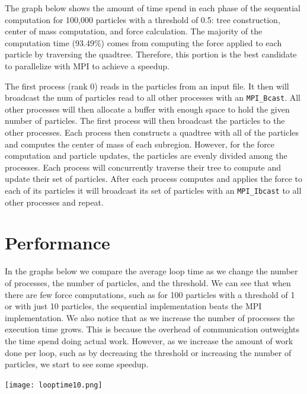 \documentclass{article}
\begin{document}
The graph below shows the amount of time spend in each phase of the sequential
computation for 100,000 particles with a threshold of 0.5: tree construction,
center of mass computation, and force calculation.
The majority of the computation time (93.49\%) comes from computing the force applied to
each particle by traversing the quadtree.
Therefore, this portion is the best candidate to parallelize with MPI to
achieve a speedup.

\begin{center}
  
\end{center}

The first process (rank 0) reads in the particles from an input file.
It then will broadcast the num of particles read to all other processes with an
\texttt{MPI\_Bcast}.
All other processes will then allocate a buffer with enough space to hold the
given number of particles.
The first process will then broadcast the particles to the other processes.
Each process then constructs a quadtree with all of the particles and computes
the center of mass of each subregion.
However, for the force computation and particle updates, the particles are
evenly divided among the processes.
Each process will concurrently traverse their tree to compute and update their
set of particles.
After each process computes and applies the force to each of its particles it
will broadcast its set of particles with an \texttt{MPI\_Ibcast} to all other
processes and repeat.

\section{Performance}

In the graphs below we compare the average loop time as we change the number of
processes, the number of particles, and the threshold.
We can see that when there are few force computations, such as for 100
particles with a threshold of 1 or with just 10 particles, the sequential implementation beats the MPI
implementation.
We also notice that as we increase the number of processes the execution time
grows.
This is because the overhead of communication outweights the time spend doing
actual work.
However, as we increase the amount of work done per loop, such as by decreasing the
threshold or increasing the number of particles, we start to see some speedup.

\begin{center}
  \texttt{[image: looptime10.png]}
\end{center}
\end{document}
